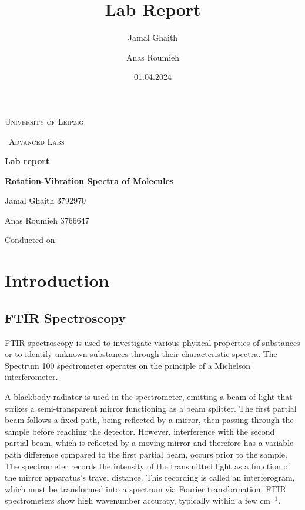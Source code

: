 \documentclass{article}
\title{Lab Report}
\author{Jamal Ghaith}
\author{Anas Roumieh}
\date{01.04.2024}
\begin{document}
\begin{titlepage}
	\centering
	{\scshape\LARGE University of Leipzig \par}
	\vspace{1cm}
	{\scshape\ Advanced Labs\par}
	\vspace{1.5cm}
	{\huge\bfseries Lab report\par}
	\vspace{2cm}
	{\huge\bfseries Rotation-Vibration Spectra of Molecules\par}
	\vspace{2cm}
	{\Large Jamal Ghaith 3792970\par}
    {\Large Anas Roumieh 3766647\par}
	\vfill

    {\Large Conducted on: \par}
	\vfill
\end{titlepage}


\tableofcontents
{}
\pagebreak{}

\section{Introduction}

\subsection{FTIR Spectroscopy}

FTIR spectroscopy is used to investigate various physical properties of substances or to identify unknown substances through their characteristic spectra. The Spectrum 100 spectrometer operates on the principle of a Michelson interferometer.

A blackbody radiator is used in the spectrometer, emitting a beam of light that strikes a semi-transparent mirror functioning as a beam splitter. The first partial beam follows a fixed path, being reflected by a mirror, then passing through the sample before reaching the detector. However, interference with the second partial beam, which is reflected by a moving mirror and therefore has a variable path difference compared to the first partial beam, occurs prior to the sample. The spectrometer records the intensity of the transmitted light as a function of the mirror apparatus's travel distance. This recording is called an interferogram, which must be transformed into a spectrum via Fourier transformation. FTIR spectrometers show high wavenumber accuracy, typically within a few cm\(^{-1}\).
\end{document}
